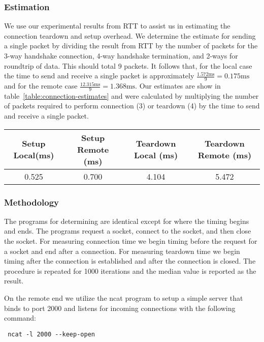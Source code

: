 \subsubsection{Estimation}
We use our experimental results from RTT to assist us in estimating the connection teardown and setup
overhead. We determine the estimate for sending a single packet by dividing the result from RTT by the number of packets for the 3-way handshake connection, 4-way handshake termination, and 2-ways for roundtrip of data. This should total 9 packets. It follows that, for the local case the time to send and receive a single packet is approximately $\frac{1.572\text{ms}}{9} = 0.175\text{ms}$ and for the remote case $\frac{12.315\text{ms}}{9} = 1.368\text{ms}$. Our estimates are show in table~\ref{table:connection-estimates} and were calculated by multiplying the number of packets required to perform connection (3) or teardown (4) by the time to send and receive a single packet.

\begin{table*}[b]
\begin{tabular}{|c|c|c|c|}
\hline
Setup Local(ms) & Setup Remote (ms) & Teardown Local (ms) & Teardown Remote (ms)\\ \hline
0.525            & 0.700          & 4.104            & 5.472          \\ \hline
\end{tabular}
\caption{Estimates for TCP connection setup and teardown overhead}
\label{table:connection-estimates}
\end{table*}

\subsubsection{Methodology}
The programs for determining are identical except for where the timing begins and ends. The programs 
request a socket, connect to the socket, and then close the socket. For measuring connection time we
begin timing before the request for a socket and end after a connection.  For measuring teardown time
 we begin timing after the connection is established and after the connection is closed. The 
 procedure is repeated for 1000 iterations and the median value is reported as the result.

 On the remote end we utilize the ncat program to setup a simple server that binds to port 2000 and listens for incoming connections with the following command:
 \begin{verbatim}
 ncat -l 2000 --keep-open
 \end{verbatim}
